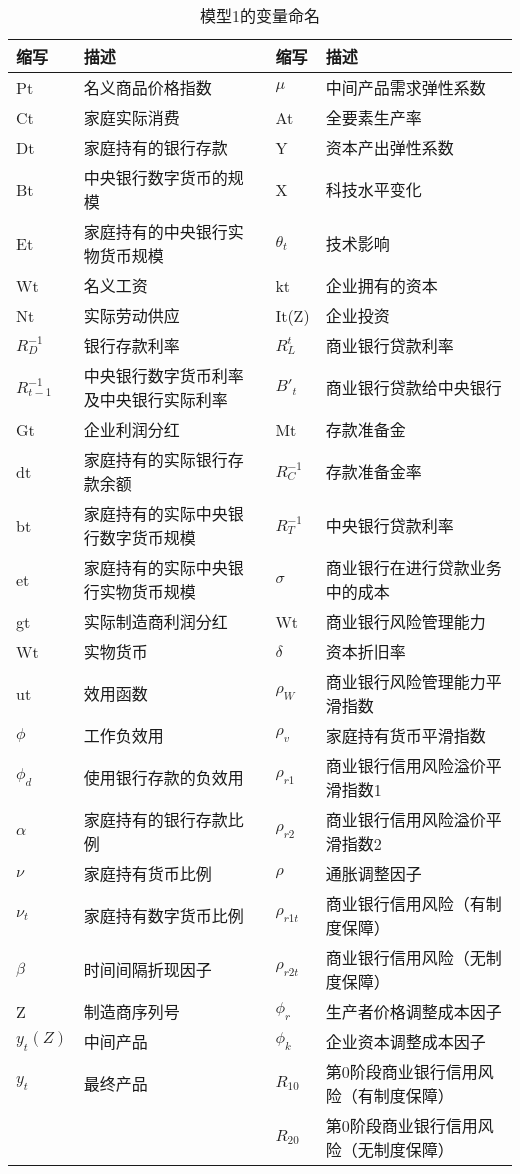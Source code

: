 \documentclass[withoutpreface,bwprint]{cumcmthesis} %
\begin{document}
\begin{table}[H]
	\centering
	\begin{tabular}{llll}
		\toprule[1.5pt]
		\textbf{缩写} & \textbf{描述} & \textbf{缩写} & \textbf{描述} \\
		\midrule[1pt]
		Pt & 名义商品价格指数 & $\mu$ & 中间产品需求弹性系数 \\
		Ct & 家庭实际消费 & At & 全要素生产率 \\
		Dt & 家庭持有的银行存款 & Y & 资本产出弹性系数 \\
		Bt & 中央银行数字货币的规模 & X & 科技水平变化 \\
		Et & 家庭持有的中央银行实物货币规模 & $\theta_t$ & 技术影响 \\
		Wt & 名义工资 & kt & 企业拥有的资本 \\
		Nt & 实际劳动供应 & It(Z) & 企业投资 \\
		$R_{D}^{-1}$ & 银行存款利率 & $R_{L}^{t}$ & 商业银行贷款利率 \\
		$R_{t-1}^{-1}$ & 中央银行数字货币利率及中央银行实际利率 & $B'_{t}$ & 商业银行贷款给中央银行 \\
		Gt & 企业利润分红 & Mt & 存款准备金 \\
		dt & 家庭持有的实际银行存款余额 & $R_{C}^{-1}$ & 存款准备金率 \\
		bt & 家庭持有的实际中央银行数字货币规模 & $R_{T}^{-1}$ & 中央银行贷款利率 \\
		et & 家庭持有的实际中央银行实物货币规模 & $\sigma$ & 商业银行在进行贷款业务中的成本 \\
		gt & 实际制造商利润分红 & Wt & 商业银行风险管理能力 \\
		Wt & 实物货币 & $\delta$ & 资本折旧率 \\
		ut & 效用函数 & $\rho_{W}$ & 商业银行风险管理能力平滑指数 \\
		$\phi$ & 工作负效用 & $\rho_{v}$ & 家庭持有货币平滑指数 \\
		$\phi_{d}$ & 使用银行存款的负效用 & $\rho_{r1}$ & 商业银行信用风险溢价平滑指数1 \\
		$\alpha$ & 家庭持有的银行存款比例 & $\rho_{r2}$ & 商业银行信用风险溢价平滑指数2 \\
		$\nu$ & 家庭持有货币比例 & $\rho$ & 通胀调整因子 \\
		$\nu_{t}$ & 家庭持有数字货币比例 & $\rho_{r1t}$ & 商业银行信用风险（有制度保障） \\
		$\beta$ & 时间间隔折现因子 & $\rho_{r2t}$ & 商业银行信用风险（无制度保障） \\
		Z & 制造商序列号 & $\phi_{r}$ & 生产者价格调整成本因子 \\
		$y_t(Z)$ & 中间产品 & $\phi_{k}$ & 企业资本调整成本因子 \\
		$y_t$ & 最终产品 & $R_{10}$ & 第0阶段商业银行信用风险（有制度保障） \\
		& & $R_{20}$ & 第0阶段商业银行信用风险（无制度保障） \\
		\bottomrule[1.5pt]
	\end{tabular}
	\caption{模型1的变量命名}
\end{table}
\end{document}

